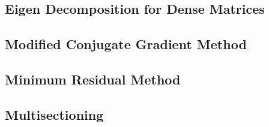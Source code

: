 \label{sec:implementation}
\subsection{Eigen Decomposition for Dense Matrices}

\subsection{Modified Conjugate Gradient Method}

\subsection{Minimum Residual Method}

\subsection{Multisectioning}
